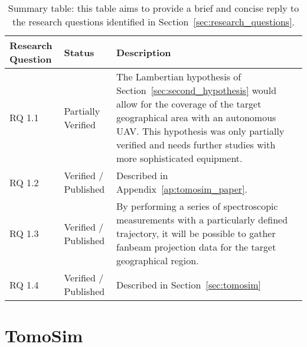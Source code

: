 \begin{table}[htb]
    \centering
    \caption{Summary table: this table aims to provide a brief and
    concise reply to the research questions identified in
    Section~\ref{sec:research_questions}.}
    \label{tab:rq_summary}
    \begin{tabularx}{\textwidth}{l l X}
        \toprule
        Research Question & Status  & Description\\
        \midrule

        RQ 1.1 & \cellcolor[HTML]{FFEB9C}\color[HTML]{AA6A17}Partially
        Verified& \cellcolor[HTML]{FFEB9C}\color[HTML]{AA6A17}The
        Lambertian hypothesis of Section~\ref{sec:second_hypothesis}
        would allow for the coverage of the target geographical area
        with an autonomous \gls{UAV}.  This hypothesis was only
        partially verified and needs further studies with more
        sophisticated equipment. \\

        \midrule

        RQ 1.2 & \cellcolor[HTML]{C6EFCD}\color[HTML]{367E33}Verified /
        Published &\cellcolor[HTML]{C6EFCD}\color[HTML]{367E33}Described in
        Appendix~\ref{ap:tomosim_paper}. \\

        \midrule

        RQ 1.3 & \cellcolor[HTML]{C6EFCD}\color[HTML]{367E33}Verified /
        Published &\cellcolor[HTML]{C6EFCD}\color[HTML]{367E33}By performing a
        series of spectroscopic measurements with a particularly defined
        trajectory, it will be possible to gather fanbeam projection
        data for the target geographical region. \\

        \midrule

        RQ 1.4 & \cellcolor[HTML]{C6EFCD}\color[HTML]{367E33}Verified /
        Published &\cellcolor[HTML]{C6EFCD}\color[HTML]{367E33}Described in
        Section~\ref{sec:tomosim}\\

        \bottomrule
        
    \end{tabularx}
\end{table}




\section{TomoSim}%
\label{sec:tomosim_conclusions}

